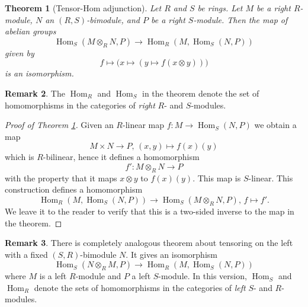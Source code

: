\documentclass[11pt]{amsbook}
\DeclareMathOperator\Hom{Hom}
\theoremstyle{plain}
\newtheorem{theorem}{Theorem}
\theoremstyle{definition}
\newtheorem{remark}[theorem]{Remark}
\begin{document}
\begin{theorem}[Tensor-Hom adjunction]\label{thm:tensor-hom-adjunction}
Let $R$ and $S$ be rings. Let $M$ be a right $R$-module, $N$ an $(R,S)$-bimodule, and $P$ be a right $S$-module. Then the map of abelian groups
\[
	\Hom_S(M\otimes_R N, P) \to \Hom_R(M,\Hom_S(N,P))
\]
given by
\[
	f \mapsto \big( x \mapsto ( y \mapsto f(x\otimes y) )\big)
\]
is an isomorphism.
\end{theorem}

\begin{remark}
The $\Hom_R$ and $\Hom_S$ in the theorem denote the set of homomorphisms in the categories of \emph{right} $R$- and $S$-modules. 
\end{remark}


\begin{proof}[Proof of Theorem \ref{thm:tensor-hom-adjunction}]
Given an $R$-linear map $f\colon M\to \Hom_S(N,P)$ we obtain a map
\[
	M\times N \to P,\,  (x,y) \mapsto f(x)(y)
\]
which is $R$-bilinear, hence it defines a homomorphism
\[
	f'\colon M\otimes_R N \to P
\]
with the property that it maps $x\otimes y$ to $f(x)(y)$. This map is $S$-linear. This construction defines a homomorphism 
\[
	\Hom_R(M,\Hom_S(N,P)) \to \Hom_S(M\otimes_R N, P),\, f\mapsto f'.
\]
We leave it to the reader to verify that this is a two-sided inverse to the map in the theorem.
\end{proof}

\begin{remark}\label{thm:alternate-adjunction}
There is completely analogous theorem about tensoring on the left with a fixed $(S,R)$-bimodule $N$. It gives an isomorphism
\[
	\Hom_S(N\otimes_R M, P) \to \Hom_R(M, \Hom_S(N,P))
\]
where $M$ is a left $R$-module and $P$ a left $S$-module. In this version, $\Hom_S$ and $\Hom_R$ denote the sets of homomorphisms in the categories of \emph{left} $S$- and $R$-modules.
\end{remark}
\end{document}
